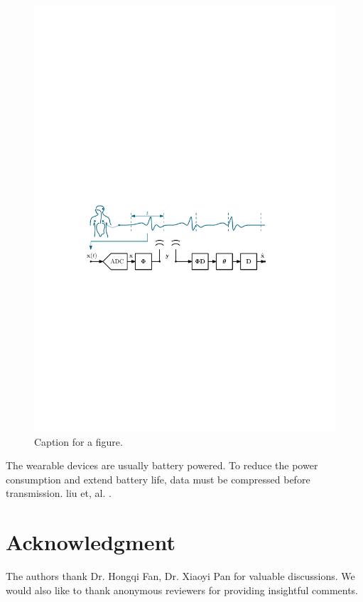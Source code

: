 \documentclass[twocolumn,letterpaper,10pt]{IEEEtran}
\begin{document}
\begin{figure}[!htbp]
    \centering
    \includegraphics[width=\columnwidth]{diagram}
    \caption{Caption for a figure.}
\end{figure}

The wearable devices are usually battery powered. To reduce the power consumption and extend battery life,
data must be compressed before transmission. liu et, al. \cite{liu2013energy}.

\section*{Acknowledgment}
The authors thank Dr. Hongqi Fan, Dr. Xiaoyi Pan for valuable discussions.
We would also like to thank anonymous reviewers for providing insightful comments.

\ifCLASSOPTIONcaptionsoff
  \newpage
\fi
\end{document}
